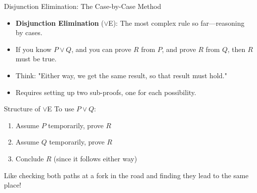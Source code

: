 \documentclass{beamer}
\begin{document}
	\begin{frame}{Disjunction Elimination: The Case-by-Case Method}
		\begin{itemize}
			\item \textbf{Disjunction Elimination} ($\lor$E): The most complex rule so far—reasoning by cases.
			\item If you know $P \lor Q$, and you can prove $R$ from $P$, and prove $R$ from $Q$, then $R$ must be true.
			\item Think: "Either way, we get the same result, so that result must hold."
			\item Requires setting up two sub-proofs, one for each possibility.
		\end{itemize}
		
		\begin{alertblock}{Structure of $\lor$E}
			\small
			To use $P \lor Q$:
			\begin{enumerate}
				\item Assume $P$ temporarily, prove $R$
				\item Assume $Q$ temporarily, prove $R$
				\item Conclude $R$ (since it follows either way)
			\end{enumerate}
			Like checking both paths at a fork in the road and finding they lead to the same place!
		\end{alertblock}
	\end{frame}
	
\end{document}
